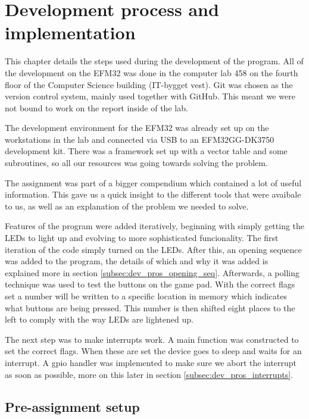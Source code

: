 \section{Development process and implementation}
\label{chap:development_process}

This chapter details the steps used during the development of the program. All of the development on the EFM32 was done in the computer lab 458 on the fourth floor of the Computer Science building (IT-bygget vest). Git was chosen as the version control system, mainly used together with GitHub. This meant we were not bound to work on the report inside of the lab.

The development environment for the EFM32 was already set up on the workstations in the lab and connected via USB to an EFM32GG-DK3750 development kit. There was a framework set up with a vector table and some subroutines, so all our resources was going towards solving the problem.

The assignment was part of a bigger compendium which contained a lot of useful information. This gave us a quick insight to the different tools that were avaibale to us, as well as an explanation of the problem we needed to solve.

Features of the program were added iteratively, beginning with simply getting the LEDs to light up and evolving to more sophisticated funcionality. The first iteration of the code simply turned on the LEDs. After this, an opening sequence was added to the program, the details of which and why it was added is explained more in section \ref{subsec:dev_pros_opening_seq}. Afterwards, a polling technique was used to test the buttons on the game pad. With the correct flags set a number will be written to a specific location in memory which indicates what buttons are being pressed. This number is then shifted eight places to the left to comply with the way LEDs are lightened up.

The next step was to make interrupts work. A main function was constructed to set the correct flags. When these are set the device goes to sleep and waits for an interrupt. A gpio handler was implemented to make sure we abort the interrupt as soon as possible, more on this later in section \ref{subsec:dev_pros_interrupts}.

\subsection{Pre-assignment setup}
\label{subsec:pre-assingment_setup}

